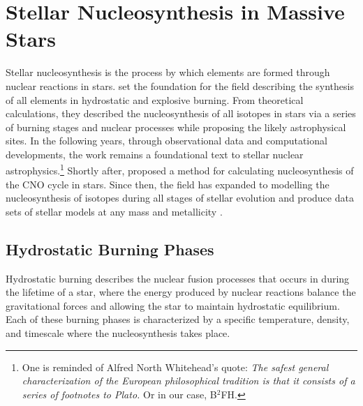 \section{Stellar Nucleosynthesis in Massive Stars}

Stellar nucleosynthesis is the process by which elements are formed through nuclear reactions in stars.
\cite{burbidgeSynthesisElementsStars1957} set the foundation for the field describing the synthesis of all elements in hydrostatic and explosive burning.
From theoretical calculations, they described the nucleosynthesis of all isotopes in stars via a series of burning stages and nuclear processes while proposing the likely astrophysical sites.
In the following years, through observational data and computational developments, the work remains a foundational text to stellar nuclear astrophysics.\footnote{One is reminded of Alfred North Whitehead's quote: \textit{The safest general characterization of the European philosophical tradition is that it consists of a series of footnotes to Plato.} Or in our case, B$^2$FH.}
Shortly after, \cite{henyeyNewMethodAutomatic1964} proposed a method for calculating nucleosynthesis of the CNO cycle in stars.
Since then, the field has expanded to modelling the nucleosynthesis of isotopes during all stages of stellar evolution and produce data sets of stellar models at any mass and metallicity \citep{pignatariNuGridStellarData2016, ritterNuGridStellarData2018, battinoNuGridStellarData2019}.

\subsection{Hydrostatic Burning Phases}

Hydrostatic burning describes the nuclear fusion processes that occurs in during the lifetime of a star, where the energy produced by nuclear reactions balance the gravitational forces and allowing the star to maintain hydrostatic equilibrium.
Each of these burning phases is characterized by a specific temperature, density, and timescale where the nucleosynthesis takes place.

